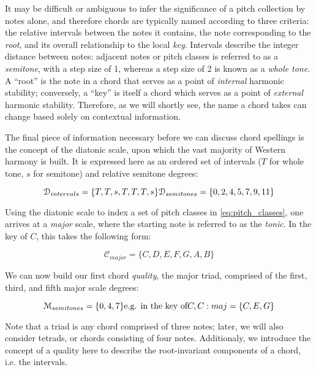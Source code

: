 It may be difficult or ambiguous to infer the significance of a pitch collection by notes alone, and therefore chords are typically named according to three criteria: the relative intervals between the notes it contains, the note corresponding to the \emph{root}, and its overall relationship to the local \emph{key}.
Intervals describe the integer distance between notes: adjacent notes or pitch classes is referred to as a \emph{semitone}, with a step size of 1, whereas a step size of 2 is known as a \emph{whole tone}.
A ``root'' is the note in a chord that serves as a point of \emph{internal} harmonic stability; conversely, a ``key'' is itself a chord which serves as a point of \emph{external} harmonic stability.
Therefore, as we will shortly see, the name a chord takes can change based solely on contextual information.

The final piece of information necessary before we can discuss chord spellings is the concept of the diatonic scale, upon which the vast majority of Western harmony is built.
It is expressed here as an ordered set of intervals ($T$ for whole tone, $s$ for semitone) and relative semitone degrees:

\begin{equation}
\mathcal{D}_{intervals} = \{T, T, s, T, T, T, s\} \\
\mathcal{D}_{semitones} = \{0, 2, 4, 5, 7, 9, 11\}
\end{equation}

\noindent Using the diatonic scale to index a set of pitch classes in \ref{eq:pitch_classes}, one arrives at a \emph{major} scale, where the starting note is referred to as the \emph{tonic}.
In the key of $C$, this takes the following form:

\begin{equation}
\mathcal{C}_{major} = \{C, D, E, F, G, A, B\}
\end{equation}

We can now build our first chord \emph{quality}, the major triad, comprised of the first, third, and fifth major scale degrees:

\begin{equation}
\mathcal{M}_{semitones} = \{0, 4, 7\} \\
\text{e.g. in the key of} C, C:maj = \{C, E, G\}
\end{equation}

Note that a triad is any chord comprised of three notes; later, we will also consider tetrads, or chords consisting of four notes.
Additionaly, we introduce the concept of a quality here to describe the root-invariant components of a chord, i.e. the intervals.


